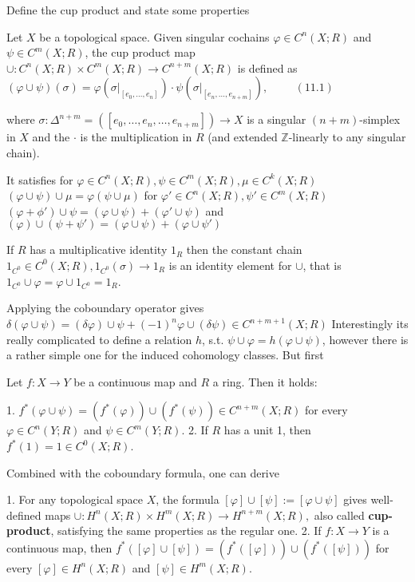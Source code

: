 Define the cup product and state some properties

Let \(X\) be a topological space. Given singular cochains \(\varphi \in C^n(X; R)\) and \(\psi \in C^m(X; R)\), 
the cup product map \( \cup : C^n(X;R) \times C^m(X;R) \to C^{n+m}(X;R) \) is defined as
\(
(\varphi \cup \psi)(\sigma) = \varphi(\sigma|_{[e_0, \dotsc, e_n]}) \cdot \psi(\sigma|_{[e_n, \dotsc, e_{n+m}]}), \hspace{1cm} (11.1)
\)

where \(\sigma : \Delta^{n+m} = ([e_0, \dotsc, e_n, \dotsc, e_{n+m}]) \to X\) is a singular \((n + m)\)-simplex in \(X\) and the \(\cdot\) is the multiplication in \(R\) 
(and extended \(\mathbb{Z}\)-linearly to any singular chain).

It satisfies for \( \varphi \in C^n(X;R), \psi \in C^m(X;R), \mu \in C^k(X;R) \)
\( (\varphi \cup \psi) \cup \mu = \varphi(\psi \cup \mu) \)
for \( \varphi' \in C^n(X;R), \psi' \in C^m(X;R) \)
\( (\varphi + \phi') \cup \psi = (\varphi \cup \psi) + (\varphi' \cup \psi) \)
and 
\( (\varphi) \cup (\psi + \psi') = (\varphi \cup \psi) + (\varphi \cup \psi') \)

If \( R \) has a multiplicative identity \( 1_R \) then the constant chain \( 1_{C^0} \in C^0(X;R), 1_{C^0}(\sigma) \to 1_R \) 
is an identity element for \( \cup \), that is \( 1_{C^0} \cup \varphi = \varphi \cup 1_{C^0} = 1_R \).

Applying the coboundary operator gives
\( \delta(\varphi \cup \psi) = (\delta \varphi) \cup \psi + (-1)^n \varphi \cup (\delta \psi) \in C^{n+m+1}(X;R) \)
Interestingly its really complicated to define a relation \( h \), s.t. 
\( \psi \cup \varphi = h(\varphi \cup \psi) \), 
however there is a rather simple one for the induced cohomology classes. But first

Let \(f : X \to Y\) be a continuous map and \(R\) a ring. Then it holds:

1. \(f^* (\varphi \cup \psi) = (f^*(\varphi)) \cup (f^*(\psi)) \in C^{n+m}(X; R)\) for every \(\varphi \in C^n(Y; R)\) and \(\psi \in C^m(Y; R)\).
2. If \(R\) has a unit 1, then \(f^*(1) = 1 \in C^0(X; R)\).

Combined with the coboundary formula, one can derive

1. For any topological space \(X\), the formula \([\varphi] \cup [\psi] := [\varphi \cup \psi]\) gives well-defined maps 
\(\cup : H^n(X; R) \times H^m(X; R) \to H^{n+m}(X; R),\)
also called \textbf{cup-product}, satisfying the same properties as the regular one.
2. If \(f : X \to Y\) is a continuous map, then \(f^*([\varphi] \cup [\psi]) = (f^*([\varphi])) \cup (f^*([\psi]))\) for every \([\varphi] \in H^n(X; R)\) and \([\psi] \in H^m(X; R)\).

